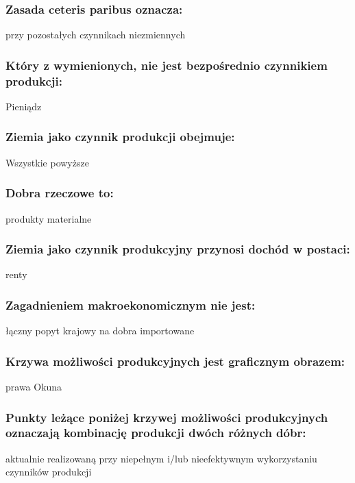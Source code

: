 \documentclass[a4paper,12pt]{article}
\begin{document}
\subsubsection{Zasada ceteris paribus oznacza:}

przy pozostałych czynnikach niezmiennych

\subsubsection{Który z wymienionych, nie jest bezpośrednio czynnikiem produkcji:}

Pieniądz

\subsubsection{Ziemia jako czynnik produkcji obejmuje:}

Wszystkie powyższe

\subsubsection{Dobra rzeczowe to:}

produkty materialne

\subsubsection{Ziemia jako czynnik produkcyjny przynosi dochód w postaci:}

renty 

\subsubsection{Zagadnieniem makroekonomicznym nie jest:}

łączny popyt krajowy na dobra importowane

\subsubsection{Krzywa możliwości produkcyjnych jest graficznym obrazem:}

prawa Okuna

\subsubsection{Punkty leżące poniżej krzywej możliwości produkcyjnych oznaczają kombinację produkcji dwóch różnych dóbr:}

aktualnie realizowaną przy niepełnym i/lub nieefektywnym wykorzystaniu czynników produkcji
\end{document}
